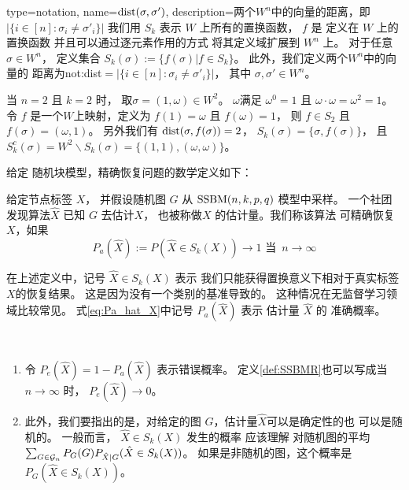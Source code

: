 {
  type=notation,
  name={$\operatorname{dist}(\sigma, \sigma')$},
  description={两个$W^n$中的向量的距离，即$|\{i\in[n]:\sigma_i\neq \sigma'_i\}|$}
}
我们用 $S_k$ 表示 $W$  上所有的置换函数， 
$f$ 是 定义在 $W$ 上的置换函数
并且可以通过逐元素作用的方式
将其定义域扩展到 $W^n$ 上。
对于任意 $\sigma \in W^n$，
定义集合 $S_k(\sigma):=\{f(\sigma)| f\in S_k\}$。
此外，我们定义两个$W^n$中的向量的
距离为\gls{not:dist}$=|\{i\in[n]:\sigma_i\neq \sigma'_i\}|$，
其中 $\sigma,\sigma'\in W^n
$。
\begin{example}
当 $n=2$ 且 $k=2$ 时，
取$\sigma=(1, \omega) \in W^2$。
$\omega$满足
$\omega^0 = 1$ 且 $\omega \cdot \omega = \omega^2 = 1$。
令 $f$ 是一个$W$上映射，定义为
$f(1) = \omega$ 且 $f(\omega)=1$，
则 $f \in S_2$ 且 $f(\sigma) = (\omega, 1)$。
另外我们有 $\operatorname{dist}(\sigma, f(\sigma)) = 2$，
$S_k(\sigma) = \{\sigma, f(\sigma)\}$， 且
$S_k^c(\sigma) = W^2 \backslash S_k(\sigma)
=\{(1, 1), (\omega, \omega)\}$。
\end{example}

给定 随机块模型，精确恢复问题的数学定义如下：
\begin{definition} \label{def:SSBMR}
给定节点标签 $X$， 并假设随机图 $G$ 从 $\operatorname{SSBM}(n,k,p,q)   $ 模型中采样。
一个社团发现算法$\hat{X}$ 已知 $G$ 去估计$X$，
也被称做$X$ 的估计量。我们称该算法
可精确恢复$X$，如果
\begin{equation}\label{eq:Pa_hat_X}
P_a(\hat{X}):=P(\hat{X} \in S_k(X)) \to 1 \textrm{ 当 }\, n \to \infty
\end{equation}
\end{definition}

在上述定义中，记号 $\hat{X} \in S_k(X)$ 表示
我们只能获得置换意义下相对于真实标签$X$的恢复结果。
这是因为没有一个类别的基准导致的。
这种情况在无监督学习领域比较常见。
式\eqref{eq:Pa_hat_X}中记号 $P_a(\hat{X})$
表示 估计量 $\hat{X}$ 的
准确概率。
\begin{remark}\label{rem:metric_exact_recovery}\,
  \begin{enumerate}
    \item 令 $P_e(\hat{X}) = 1 - P_a(\hat{X})$
    表示错误概率。
    定义\ref{def:SSBMR}也可以写成当$n\to \infty$
    时，
    $P_e(\hat{X}) \to 0$。
  \item  此外，我们要指出的是，对给定的图 $G$，估计量$\hat{X}$可以是确定性的也
  可以是随机的。
  一般而言， $\hat{X} \in S_k(X)$ 发生的概率 应该理解
  对随机图的平均 $\sum_{G \in \mathcal{G}_n} P_G(G) P_{\hat{X}|G}(\hat{X} \in S_k(X))$。 
  如果是非随机的图，这个概率是 $P_G(\hat{X} \in S_k(X))$。  
  \end{enumerate}
\end{remark}

